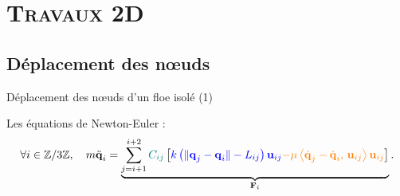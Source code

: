 


\section{\textsc{Travaux 2D}}


\subsection{Déplacement des n\oe{}uds}


\begin{frame}{Déplacement des n\oe{}uds d'un floe isolé (1)}



    Les équations de Newton-Euler :
    \begin{align*}
        \forall i \in \mathbb{Z}/3\mathbb{Z}, \quad m \ddot{\bm{\mathrm{q}}}_i = \underbrace{\sum_{j=i+1}^{i+2} \textcolor{teal}{C_{ij}} \left[  \textcolor{blue}{k \left( \Vert \bm{\mathrm{q}}_j - \bm{\mathrm{q}}_i \Vert - L_{ij} \right) \bm{\mathrm{u}}_{ij}} \textcolor{orange}{- \mu \left\langle \dot{\bm{\mathrm{q}}}_j - \dot{\bm{\mathrm{q}}}_i, \, \bm{\mathrm{u}}_{ij}  \right\rangle  \bm{\mathrm{u}}_{ij}}  \right]}_{\bm{\mathrm{F}}_i} . 
    \end{align*}


\end{frame}
